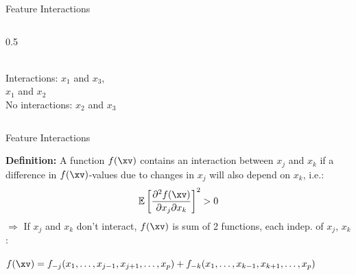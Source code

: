 \documentclass[10pt,compress,t,notes=noshow, xcolor=table]{beamer}
\begin{document}
\begin{frame}{Feature Interactions}
\begin{itemize}
\begin{columns}[T, totalwidth=\textwidth]
\begin{column}{0.5\textwidth}
\\
\phantom{No} Interactions: $x_1$ and $x_3$,\\
\phantom{No Interactions:} $x_1$ and $x_2$\phantom{,}\\
No interactions: $x_2$ and $x_3$\phantom{,}

\end{column}
\end{columns}
\end{itemize}
\end{frame}

\begin{frame}{Feature Interactions }

\textbf{Definition:} A function $f(\xv)$ contains an interaction between $x_j$ and $x_k$ if a difference in $f(\xv)$-values due to changes in $x_j$ will also depend on $x_k$, i.e.: %
$$
\mathbb{E} \left[ \frac{\partial^2 f(\xv)}{\partial x_j \partial x_k} \right]^2 > 0
$$
$\Rightarrow$ If $x_j$ and $x_k$ don't interact, $f(\xv)$ is sum of 2 functions, each indep. of $x_j$, $x_k$:

\medskip

\centerline{$f(\xv) = f_{-j}(x_1, \ldots, x_{j-1}, x_{j+1}, \ldots, x_p) + f_{-k}(x_1, \ldots, x_{k-1}, x_{k+1}, \ldots, x_p)$}


\end{frame}
\end{document}
